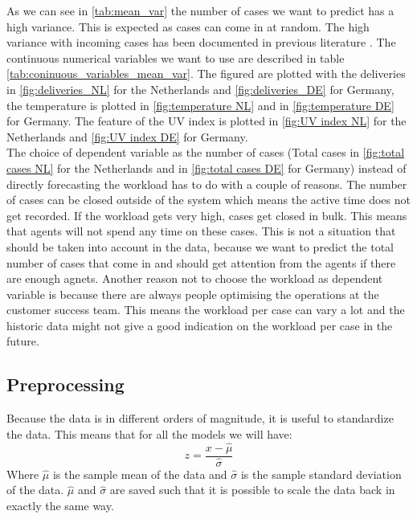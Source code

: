 As we can see in \autoref{tab:mean_var} the number of cases we want to predict has a high variance. This is expected as cases can come in at random. The high variance with incoming cases has been documented in previous literature \citep{Stolletz2011ArticleManagement}. The continuous numerical variables we want to use are described in table \ref{tab:coninuous_variables_mean_var}. The figured are plotted with the deliveries in \autoref{fig:deliveries_NL} for the Netherlands and \autoref{fig:deliveries_DE} for Germany, the temperature is plotted in \autoref{fig:temperature NL} and in \autoref{fig:temperature DE} for Germany. The feature of the UV index is plotted in \autoref{fig:UV index NL} for the Netherlands and \autoref{fig:UV index DE} for Germany.\\

The choice of dependent variable as the number of cases (Total cases in \autoref{fig:total cases NL} for the Netherlands and in \autoref{fig:total cases DE} for Germany) instead of directly forecasting the workload has to do with a couple of reasons. The number of cases can be closed outside of the system which means the active time does not get recorded. If the workload gets very high, cases get closed in bulk. This means that agents will not spend any time on these cases. This is not a situation that should be taken into account in the data, because we want to predict the total number of cases that come in and should get attention from the agents if there are enough agnets. Another reason not to choose the workload as dependent variable is because there are always people optimising the operations at the customer success team. This means the workload per case can vary a lot and the historic data might not give a good indication on the workload per case in the future.\\

\subsection{Preprocessing}
Because the data is in different orders of magnitude, it is useful to standardize the data. This means that for all the models we will have:
\begin{equation}
    z = \frac{x - \hat{\mu}}{\hat{\sigma}}
\end{equation}
Where $\hat{\mu}$ is the sample mean of the data and $\hat{\sigma}$ is the sample standard deviation of the data. $\hat{\mu}$ and $\hat{\sigma}$ are saved such that it is possible to scale the data back in exactly the same way.\\

